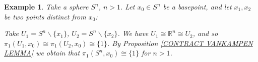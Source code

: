 \documentclass[11pt, letterpaper, oneside]{report}
\theoremstyle{pplain}
\theoremstyle{ddefinition}
\newtheorem{example}[theorem]{Example}
\theoremstyle{nnn}
\theoremstyle{eexercise}
\newcommand{\R}{{\mathbb R}}
\newcommand{\ssmin}{\smallsetminus}
\begin{document}
\begin{example}
\label{PI1 SN TRIVIAL EXAMPLE}
Take a sphere $S^{n}$, $n> 1$. Let $x_{0}\in S^{n}$ be a basepoint, and let $x_{1}, x_{2}$ be two points 
distinct from $x_{0}$:


Take $U_{1}= S^{n}\ssmin\{x_{1}\}$,  $U_{2}= S^{n}\ssmin \{x_{2}\}$. 
We have $U_{1}\cong \R^{n}\cong U_{2}$, 
and so $\pi_{1}(U_{1}, x_{0})\cong \pi_{1}(U_{2}, x_{0})\cong \{1\}$. By Proposition 
\ref{CONTRACT VANKAMPEN LEMMA} we obtain that $\pi_{1}(S^{n}, x_{0})\cong \{1\}$ for $n>1$. 
\end{example}
\end{document}
